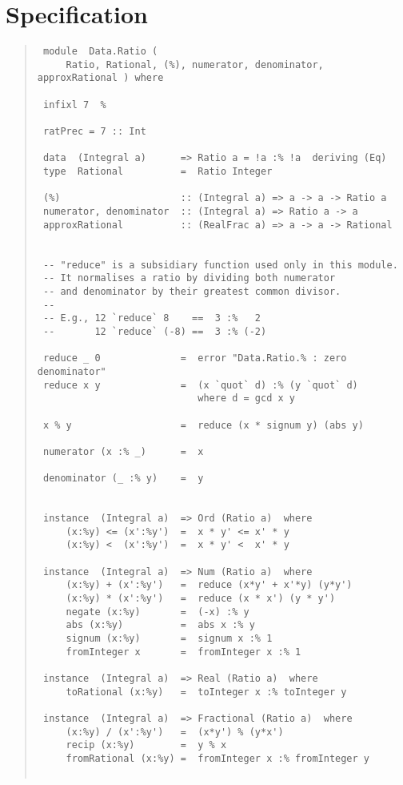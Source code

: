 \section{Specification
}
\begin{quote}

{\haddockverb\scriptsize\begin{verbatim}
 module  Data.Ratio (
     Ratio, Rational, (%), numerator, denominator, approxRational ) where
 
 infixl 7  %
 
 ratPrec = 7 :: Int
 
 data  (Integral a)      => Ratio a = !a :% !a  deriving (Eq)
 type  Rational          =  Ratio Integer
 
 (%)                     :: (Integral a) => a -> a -> Ratio a
 numerator, denominator  :: (Integral a) => Ratio a -> a
 approxRational          :: (RealFrac a) => a -> a -> Rational
 
 
 -- "reduce" is a subsidiary function used only in this module.
 -- It normalises a ratio by dividing both numerator
 -- and denominator by their greatest common divisor.
 --
 -- E.g., 12 `reduce` 8    ==  3 :%   2
 --       12 `reduce` (-8) ==  3 :% (-2)
 
 reduce _ 0              =  error "Data.Ratio.% : zero denominator"
 reduce x y              =  (x `quot` d) :% (y `quot` d)
                            where d = gcd x y
 
 x % y                   =  reduce (x * signum y) (abs y)
 
 numerator (x :% _)      =  x
 
 denominator (_ :% y)    =  y
 
 
 instance  (Integral a)  => Ord (Ratio a)  where
     (x:%y) <= (x':%y')  =  x * y' <= x' * y
     (x:%y) <  (x':%y')  =  x * y' <  x' * y
 
 instance  (Integral a)  => Num (Ratio a)  where
     (x:%y) + (x':%y')   =  reduce (x*y' + x'*y) (y*y')
     (x:%y) * (x':%y')   =  reduce (x * x') (y * y')
     negate (x:%y)       =  (-x) :% y
     abs (x:%y)          =  abs x :% y
     signum (x:%y)       =  signum x :% 1
     fromInteger x       =  fromInteger x :% 1
 
 instance  (Integral a)  => Real (Ratio a)  where
     toRational (x:%y)   =  toInteger x :% toInteger y
 
 instance  (Integral a)  => Fractional (Ratio a)  where
     (x:%y) / (x':%y')   =  (x*y') % (y*x')
     recip (x:%y)        =  y % x
     fromRational (x:%y) =  fromInteger x :% fromInteger y
 

\end{verbatim}}
\end{quote}
